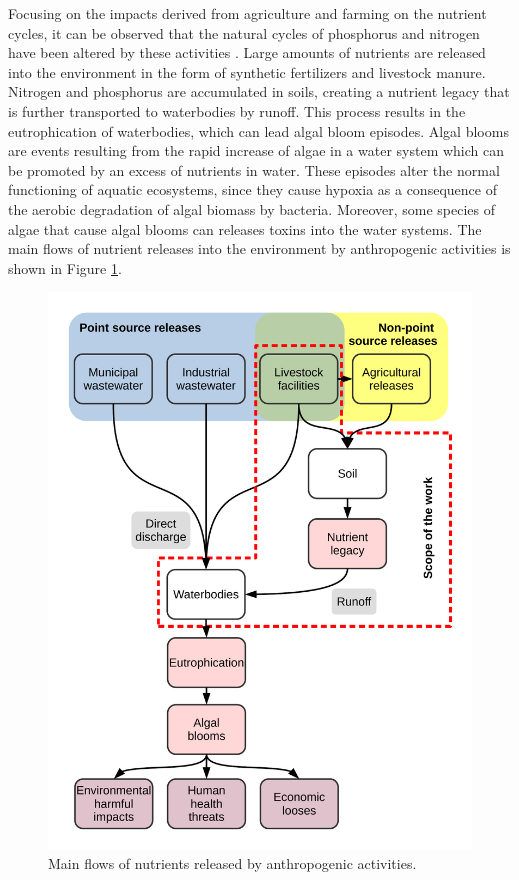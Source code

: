 \begin{refsection}[referencesCh1]
Focusing on the impacts derived from agriculture and farming on the nutrient cycles, it can be observed that the natural cycles of phosphorus and nitrogen have been altered by these activities \citep{Bouwman2009}. Large amounts of nutrients are released into the environment in the form of synthetic fertilizers and livestock manure. Nitrogen and phosphorus are accumulated in soils, creating a nutrient legacy that is further transported to waterbodies by runoff. This process results in the eutrophication of waterbodies, which can lead algal bloom episodes. Algal blooms are events resulting from the rapid increase of algae in a water system which can be promoted by an excess of nutrients in water. These episodes alter the normal functioning of aquatic ecosystems, since
they cause hypoxia as a consequence of the aerobic degradation of algal biomass by bacteria. Moreover, some species of algae that cause algal blooms can releases toxins into the water systems. The main flows of nutrient releases into the environment by anthropogenic activities is shown in Figure \ref{fig:Ch1NutrientsFlow}. 

\begin{figure}[h]
	\centering
	\includegraphics[width=0.8\linewidth, trim={1cm 1cm 1cm 1cm},clip]{gfx/Chapter1/IntroFig1.pdf} 
	\caption{Main flows of nutrients released by anthropogenic activities.}
	\label{fig:Ch1NutrientsFlow}
\end{figure}


\end{refsection}
